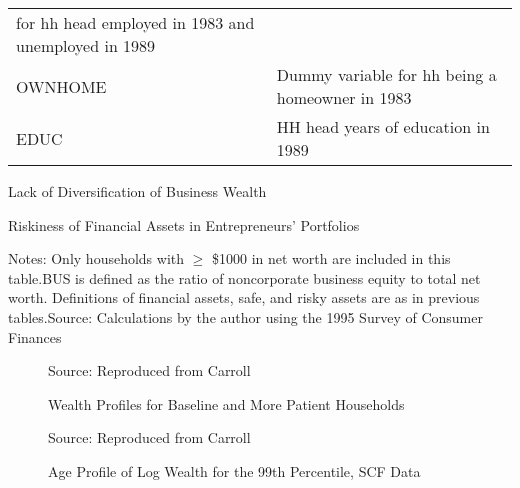 \documentclass[12pt]{article}
\begin{document}
{{\begin{tabular}{ll}
for hh head employed in 1983 and unemployed in 1989\\ OWNHOME &  Dummy
variable for hh being a homeowner in 1983\\ EDUC &  HH head years of
education in
1989\end{tabular}\normalsize\clearpage\begin{table}\caption{Lack of
Diversification of Business
Wealth}\medskip\label{table:buswnotdiversified}\centerline{%
}\end{table}\clearpage\begin{table}%
\caption{Riskiness of Financial Assets in Entrepreneurs'
Portfolios}\label{table:busownriskyfin}\centerline{%
}\vspace{.05in} \noindent \medskip Notes: Only
households with $\geq $ \$1000 in net worth are included in this table.BUS
is defined as the ratio of noncorporate business equity to total net worth. 
Definitions of financial assets, safe, and risky assets are as in previous
tables.Source: Calculations by the author using the 1995 Survey of Consumer
Finances	\end{table}} }

{\normalsize \clearpage}

{\normalsize 
\begin{figure}[tbp]
\caption{Wealth Profiles for Baseline and More Patient Households}
\label{fig:Top1pctWProfilePatientvsSCF}{\normalsize \centerline{%
} \medskip\medskip\medskip%
\medskip  Source: Reproduced from Carroll~\cite{carroll:richsave} }
\end{figure}
}

{\normalsize 
\begin{figure}[tbp]
\caption{Age Profile of Log Wealth for the 99th Percentile, SCF Data}
\label{fig:OldRichDontDissave}{\normalsize \centerline{%
} \medskip\medskip\medskip\medskip 
Source: Reproduced from Carroll~\cite{carroll:richsave} }
\end{figure}
}
\end{document}
